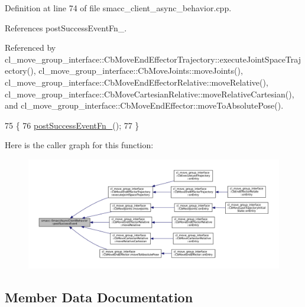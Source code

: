Definition at line 74 of file smacc\+\_\+client\+\_\+async\+\_\+behavior.\+cpp.



References post\+Success\+Event\+Fn\+\_\+.



Referenced by cl\+\_\+move\+\_\+group\+\_\+interface\+::\+Cb\+Move\+End\+Effector\+Trajectory\+::execute\+Joint\+Space\+Trajectory(), cl\+\_\+move\+\_\+group\+\_\+interface\+::\+Cb\+Move\+Joints\+::move\+Joints(), cl\+\_\+move\+\_\+group\+\_\+interface\+::\+Cb\+Move\+End\+Effector\+Relative\+::move\+Relative(), cl\+\_\+move\+\_\+group\+\_\+interface\+::\+Cb\+Move\+Cartesian\+Relative\+::move\+Relative\+Cartesian(), and cl\+\_\+move\+\_\+group\+\_\+interface\+::\+Cb\+Move\+End\+Effector\+::move\+To\+Absolute\+Pose().


\begin{DoxyCode}
75     \{
76         \hyperlink{classsmacc_1_1SmaccAsyncClientBehavior_a944ed10880796d53649bee39dc1299c0}{postSuccessEventFn\_}();
77     \}
\end{DoxyCode}
Here is the caller graph for this function\+:
\nopagebreak
\begin{figure}[H]
\begin{center}
\leavevmode
\includegraphics[width=350pt]{classsmacc_1_1SmaccAsyncClientBehavior_adf18efe1f0e4eacc1277b8865a8a94b1_icgraph}
\end{center}
\end{figure}


\subsection{Member Data Documentation}
\mbox{\label{classsmacc_1_1SmaccAsyncClientBehavior_a6346e036a68f41c4397d7336f8519645}} 
